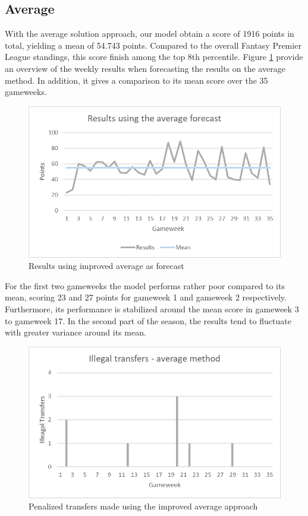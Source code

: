 \subsection{Average}
With the average solution approach, our model obtain a score of 1916 points in total, yielding a mean of 54.743 points. Compared to the overall Fantasy Premier League standings, this score finish among the top 8th percentile. Figure \ref{Results_average} provide an overview of the weekly results when forecasting the results on the average method. In addition, it gives a comparison to its mean score over the 35 gameweeks. 
\begin{figure}[H]
    \centering
    \includegraphics[scale=0.75]{fig/chapter_7/Results_average.png}
    \caption{Results using improved average as forecast}
\label{Results_average}    
\end{figure}
For the first two gameweeks the model performs rather poor compared to its mean, scoring 23 and 27 points for gameweek 1 and gameweek 2 respectively. Furthermore, its performance is stabilized around the mean score in gameweek 3 to gameweek 17. In the second part of the season, the results tend to fluctuate with greater variance around its mean. 
\begin{figure}[H]
    \centering
    \includegraphics[scale=0.75]{fig/chapter_7/Transfers_average.png}
    \caption{Penalized transfers made using the improved average approach}
\label{Transfers_average}    
\end{figure}
